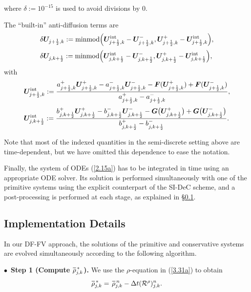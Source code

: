 \documentclass[A4paper,12pt,twoside]{article}
\numberwithin{equation}{section}
\numberwithin{figure}{section}
\numberwithin{table}{section}
\newcommand{\dt}{\Delta t}
\newcommand{\kph}{{k+\frac{1}{2}}}
\newcommand{\jph}{{j+\frac{1}{2}}}
\newcommand\eref[1]{(\ref{#1})}
\newcommand*\xbar[1]{%
  \hbox{%
    \vbox{%
      \hrule height 0.5pt %
      \kern0.4ex%
      \hbox{%
        \kern-0.05em%
        \ensuremath{#1}%
        \kern-0.00em%
      }%
    }%
  }%
}
\begin{document}
where $\delta:=10^{-15}$ is used to avoid divisions by $0$.

The ``built-in'' anti-diffusion terms are
\begin{equation}
\begin{aligned}
&\delta\bm U_{\jph,k}:={\rm minmod}\Big(\bm U_{\jph,k}^{\rm int}-\bm U^-_{\jph,k},\bm U^+_{\jph,k}-\bm U_{\jph,k}^{\rm int}\Big),\\[0.5ex]
&\delta\bm U_{j,\kph}:={\rm minmod}\Big(\bm U_{j,\kph}^{\rm int}-\bm U^-_{j,\kph},\bm U^+_{j,\kph}-\bm U_{j,\kph}^{\rm int}\Big),
\end{aligned}
\label{3.43}
\end{equation}
with 
\begin{equation}
\begin{aligned}
&\bm U_{\jph,k}^{\rm int}:=\frac{a^+_{\jph,k}\bm U^+_{\jph,k}-a^-_{\jph,k}\bm U^-_{\jph,k}
-\bm F(\bm U^+_{\jph,k})+\bm F(\bm U^-_{\jph,k})}{a^+_{\jph,k}-a^-_{\jph,k}},\\[0.5ex]
&\bm U_{j,\kph}^{\rm int}:=\frac{b^+_{j,\kph}\bm U^+_{j,\kph}-b^-_{j,\kph}\bm U^-_{j,\kph}
-\bm G\big(\bm U^+_{j,\kph}\big)+\bm G\big(\bm U^-_{j,\kph}\big)}{b^+_{j,\kph}-b^-_{j,\kph}}.
\end{aligned}
\label{3.44}
\end{equation}

Note that most of the indexed quantities in the semi-discrete setting above are time-dependent, but we have omitted this dependence to ease
the notation.

Finally, the system of ODEs \eref{2.15a} has to be integrated in time using an appropriate ODE solver. Its solution is performed
simultaneously with one of the primitive systems using the explicit counterpart of the SI-DeC scheme, and a post-processing is performed
at each stage, as explained in \S\ref{sec422}.

\subsection{Implementation Details}\label{sec422}
In our DF-FV approach, the solutions of the primitive and conservative systems are evolved simultaneously according to the following
algorithm.

\smallskip
\noindent
$\bullet\,$ \textbf{Step 1 (Compute $\xbar\rho^{\,*}_{j,k}$).} We use the $\rho$-equation in \eref{3.31a} to obtain
\begin{equation*}
\xbar\rho^{\,*}_{j,k}=\,\xbar\rho^{\,n}_{j,k}-\dt({\cal R}^\rho)^n_{j,k}.
\end{equation*}
\end{document}
